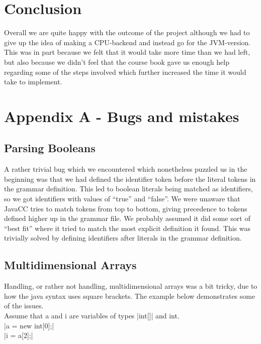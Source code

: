 \documentclass[paper=a4, fontsize=11pt]{scrartcl} %
\numberwithin{equation}{section} %
\numberwithin{figure}{section} %
\numberwithin{table}{section} %
\begin{document}
\section{Conclusion}

Overall we are quite happy with the outcome of the project although we had to give up the idea of making a CPU-backend and instead go for the JVM-version.
This was in part because we felt that it would take more time than we had left, but also because we didn’t feel that the course book gave us enough help regarding some of the steps involved which further increased the time it would take to implement.

\section{Appendix A - Bugs and mistakes}

\subsection{Parsing Booleans}

A rather trivial bug which we encountered which nonetheless puzzled us in the beginning was that we had defined the identifier token before the literal tokens in the grammar definition.
This led to boolean literals being matched as identifiers, so we got identifiers with values of “true” and “false”.
We were unaware that JavaCC tries to match tokens from top to bottom, giving precedence to tokens defined higher up in the grammar file.
We probably assumed it did some sort of “best fit” where it tried to match the most explicit definition it found.
This was trivially solved by defining identifiers after literals in the grammar definition.

\subsection{Multidimensional Arrays}

Handling, or rather not handling, multidimensional arrays was a bit tricky, due to how the java syntax uses square brackets. The example below demonstrates some of the issues.\\

Assume that a and i are variables of types |int[]| and int.\\

|a = new int[0];|\\
|i = a[2];|\\
\end{document}
